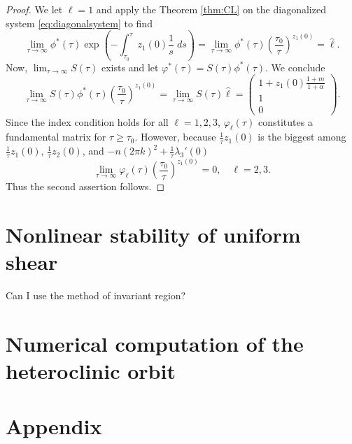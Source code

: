 \documentclass[a4paper,11pt]{article}
\def\blue{\color{blue}}
\theoremstyle{remark}
\begin{document}
\begin{proof}
We let $\ell=1$ and apply the Theorem \ref{thm:CL} on the diagonalized system \eqref{eq:diagonalsystem} to find
$$ \lim_{\tau \rightarrow \infty} \phi^*(\tau)\exp\left(-\int_{\tau_0}^\tau z_1(0)\frac{1}{s}\; ds\right) = \lim_{\tau \rightarrow \infty} \phi^*(\tau)\left(\frac{\tau_0}{\tau}\right)^{z_1(0)} = \hat{\ell}.$$
Now, $\displaystyle\lim_{\tau \rightarrow \infty} S(\tau)$ exists and let $\varphi^*(\tau) = S(\tau)\phi^*(\tau)$. We conclude
$$ \lim_{\tau \rightarrow \infty} S(\tau)\phi^*(\tau)\left(\frac{\tau_0}{\tau}\right)^{z_1(0)} = \lim_{\tau \rightarrow \infty}S(\tau)\hat{\ell} = \begin{pmatrix} 1+z_1(0)\frac{1+m}{1+\alpha}\\1\\0\end{pmatrix}.$$
Since the index condition holds for all $\ell=1,2,3$, $\varphi_\ell(\tau)$ constitutes a fundamental matrix for $\tau\ge\tau_0$. However, because $\frac{1}{\tau}z_1(0)$ is the biggest among $\frac{1}{\tau}z_1(0)$, $\frac{1}{\tau}z_2(0)$, and $-n(2\pi k)^2 + \frac{1}{\tau}\lambda_3'(0)$ 
$$ \lim_{\tau \rightarrow \infty} \varphi_\ell(\tau)\left(\frac{\tau_0}{\tau}\right)^{z_1(0)} = 0, \quad \ell=2,3.$$
Thus the second assertion follows.

\end{proof}



\section{Nonlinear stability of uniform shear}
{\blue Can I use the method of invariant region?}
% 
% 

\section{Numerical computation of the heteroclinic orbit}
 
\appendix
\section*{Appendix}
\renewcommand\thetheorem{\Alph{theorem}}
\setcounter{theorem}{\thetmp}
\end{document}
